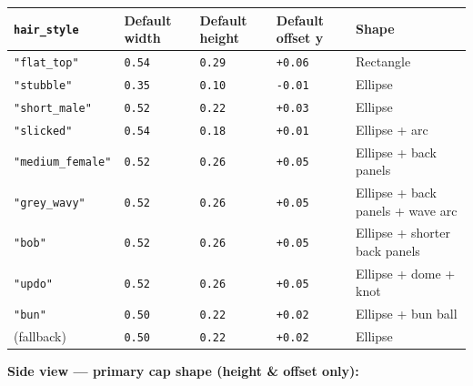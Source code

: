 \documentclass[
  11pt,
]{book}
\begin{document}
\begin{longtable}[]{@{}
  >{\raggedright\arraybackslash}p{}
  >{\raggedright\arraybackslash}p{}
  >{\raggedright\arraybackslash}p{}
  >{\raggedright\arraybackslash}p{}
  >{\raggedright\arraybackslash}p{}@{}}
\toprule\noalign{}
\texttt{hair\_style} & Default width & Default height & Default offset y
& Shape \\
\midrule\noalign{}
\endhead
\bottomrule\noalign{}
\endlastfoot
\texttt{"flat\_top"} & \texttt{0.54} & \texttt{0.29} & \texttt{+0.06} &
Rectangle \\
\texttt{"stubble"} & \texttt{0.35} & \texttt{0.10} & \texttt{-0.01} &
Ellipse \\
\texttt{"short\_male"} & \texttt{0.52} & \texttt{0.22} & \texttt{+0.03} &
Ellipse \\
\texttt{"slicked"} & \texttt{0.54} & \texttt{0.18} & \texttt{+0.01} &
Ellipse + arc \\
\texttt{"medium\_female"} & \texttt{0.52} & \texttt{0.26} & \texttt{+0.05}
& Ellipse + back panels \\
\texttt{"grey\_wavy"} & \texttt{0.52} & \texttt{0.26} & \texttt{+0.05} &
Ellipse + back panels + wave arc \\
\texttt{"bob"} & \texttt{0.52} & \texttt{0.26} & \texttt{+0.05} &
Ellipse + shorter back panels \\
\texttt{"updo"} & \texttt{0.52} & \texttt{0.26} & \texttt{+0.05} &
Ellipse + dome + knot \\
\texttt{"bun"} & \texttt{0.50} & \texttt{0.22} & \texttt{+0.02} &
Ellipse + bun ball \\
(fallback) & \texttt{0.50} & \texttt{0.22} & \texttt{+0.02} & Ellipse \\
\end{longtable}

\textbf{Side view --- primary cap shape (height \& offset only):}
\end{document}
